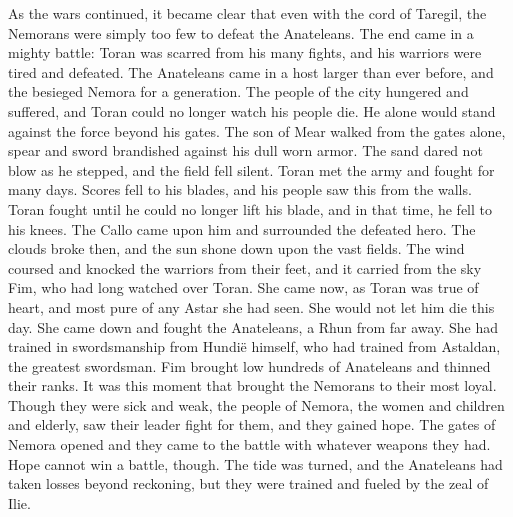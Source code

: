 \documentclass[smalldemyvopaper,11pt,twoside,onecolumn,openright,extrafontsizes]{memoir}
\begin{document}
{{	As the wars continued, it became clear that even with the cord of Taregil, the Nemorans were simply too few to defeat the Anateleans. The end came in a mighty battle: Toran was scarred from his many fights, and his warriors were tired and defeated. The Anateleans came in a host larger than ever before, and the besieged Nemora for a generation. The people of the city hungered and suffered, and Toran could no longer watch his people die. He alone would stand against the force beyond his gates. The son of Mear walked from the gates alone, spear and sword brandished against his dull worn armor. The sand dared not blow as he stepped, and the field fell silent. Toran met the army and fought for many days. Scores fell to his blades, and his people saw this from the walls. Toran fought until he could no longer lift his blade, and in that time, he fell to his knees. The Callo came upon him and surrounded the defeated hero. The clouds broke then, and the sun shone down upon the vast fields. The wind coursed and knocked the warriors from their feet, and it carried from the sky Fim, who had long watched over Toran. She came now, as Toran was true of heart, and most pure of any Astar she had seen. She would not let him die this day. She came down and fought the Anateleans, a Rhun from far away. She had trained in swordsmanship from Hundië himself, who had trained from Astaldan, the greatest swordsman. Fim brought low hundreds of Anateleans and thinned their ranks. It was this moment that brought the Nemorans to their most loyal. Though they were sick and weak, the people of Nemora, the women and children and elderly, saw their leader fight for them, and they gained hope. The gates of Nemora opened and they came to the battle with whatever weapons they had. Hope cannot win a battle, though. The tide was turned, and the Anateleans had taken losses beyond reckoning, but they were trained and fueled by the zeal of Ilie.
}}
\end{document}
